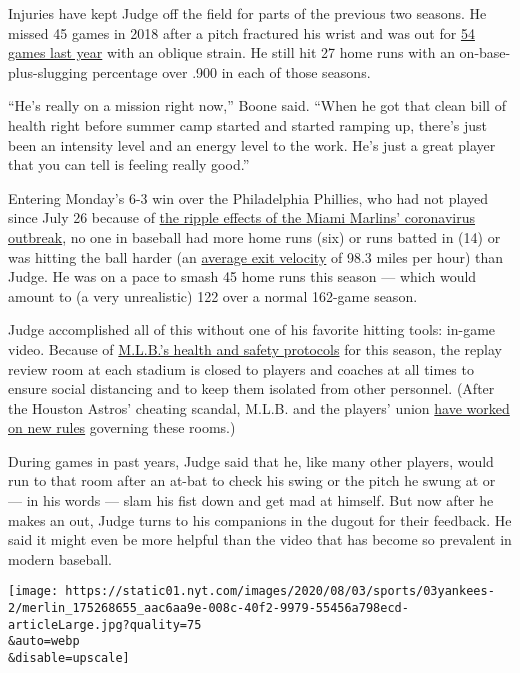 Injuries have kept Judge off the field for parts of the previous two
seasons. He missed 45 games in 2018 after a pitch fractured his wrist
and was out for
\href{https://www.nytimes.com/2019/06/21/sports/aaron-judge-yankees.html}{54
games last year} with an oblique strain. He still hit 27 home runs with
an on-base-plus-slugging percentage over .900 in each of those seasons.

``He's really on a mission right now,'' Boone said. ``When he got that
clean bill of health right before summer camp started and started
ramping up, there's just been an intensity level and an energy level to
the work. He's just a great player that you can tell is feeling really
good.''

Entering Monday's 6-3 win over the Philadelphia Phillies, who had not
played since July 26 because of
\href{https://www.nytimes.com/2020/07/29/sports/baseball/yankees-schedule.html}{the
ripple effects of the Miami Marlins' coronavirus outbreak}, no one in
baseball had more home runs (six) or runs batted in (14) or was hitting
the ball harder (an
\href{https://baseballsavant.mlb.com/leaderboard/statcast?type=batter\&year=2020\&position=\&team=\&min=q\&sort=6\&sortDir=asc}{average
exit velocity} of 98.3 miles per hour) than Judge. He was on a pace to
smash 45 home runs this season --- which would amount to (a very
unrealistic) 122 over a normal 162-game season.

Judge accomplished all of this without one of his favorite hitting
tools: in-game video. Because of
\href{https://www.nytimes.com/2020/06/24/sports/baseball/mlb-coronavirus-rules.html}{M.L.B.'s
health and safety protocols} for this season, the replay review room at
each stadium is closed to players and coaches at all times to ensure
social distancing and to keep them isolated from other personnel. (After
the Houston Astros' cheating scandal, M.L.B. and the players' union
\href{https://www.nytimes.com/2020/02/24/sports/baseball/astros-cheating-scandal.html}{have
worked on new rules} governing these rooms.)

During games in past years, Judge said that he, like many other players,
would run to that room after an at-bat to check his swing or the pitch
he swung at or --- in his words --- slam his fist down and get mad at
himself. But now after he makes an out, Judge turns to his companions in
the dugout for their feedback. He said it might even be more helpful
than the video that has become so prevalent in modern baseball.

\texttt{[image: https://static01.nyt.com/images/2020/08/03/sports/03yankees-2/merlin\_175268655\_aac6aa9e-008c-40f2-9979-55456a798ecd-articleLarge.jpg?quality=75\\\&auto=webp\\\&disable=upscale]}

